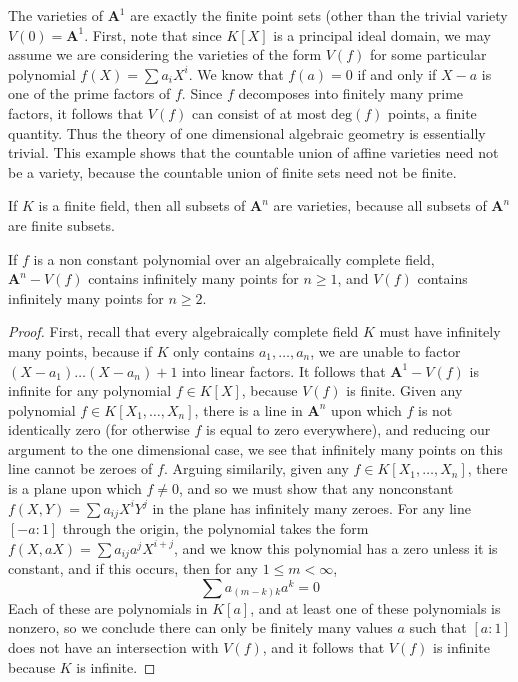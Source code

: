 \begin{example}
    The varieties of $\mathbf{A}^1$ are exactly the finite point sets (other than the trivial variety $V(0) = \mathbf{A}^1$. First, note that since $K[X]$ is a principal ideal domain, we may assume we are considering the varieties of the form $V(f)$ for some particular polynomial $f(X) = \sum a_i X^i$. We know that $f(a) = 0$ if and only if $X - a$ is one of the prime factors of $f$. Since $f$ decomposes into finitely many prime factors, it follows that $V(f)$ can consist of at most $\text{deg}(f)$ points, a finite quantity. Thus the theory of one dimensional algebraic geometry is essentially trivial. This example shows that the countable union of affine varieties need not be a variety, because the countable union of finite sets need not be finite.
\end{example}

\begin{example}
    If $K$ is a finite field, then all subsets of $\mathbf{A}^n$ are varieties, because all subsets of $\mathbf{A}^n$ are finite subsets.
\end{example}

\begin{prop}
    If $f$ is a non constant polynomial over an algebraically complete field, $\mathbf{A}^n - V(f)$ contains infinitely many points for $n \geq 1$, and $V(f)$ contains infinitely many points for $n \geq 2$.
\end{prop}
\begin{proof}
    First, recall that every algebraically complete field $K$ must have infinitely many points, because if $K$ only contains $a_1, \dots, a_n$, we are unable to factor $(X - a_1) \dots (X - a_n) + 1$ into linear factors. It follows that $\mathbf{A}^1 - V(f)$ is infinite for any polynomial $f \in K[X]$, because $V(f)$ is finite. Given any polynomial $f \in K[X_1, \dots, X_n]$, there is a line in $\mathbf{A}^n$ upon which $f$ is not identically zero (for otherwise $f$ is equal to zero everywhere), and reducing our argument to the one dimensional case, we see that infinitely many points on this line cannot be zeroes of $f$. Arguing similarily, given any $f \in K[X_1, \dots, X_n]$, there is a plane upon which $f \neq 0$, and so we must show that any nonconstant $f(X,Y) = \sum a_{ij} X^i Y^j$ in the plane has infinitely many zeroes. For any line $[-a:1]$ through the origin, the polynomial takes the form $f(X,aX) = \sum a_{ij} a^j X^{i+j}$, and we know this polynomial has a zero unless it is constant, and if this occurs, then for any $1 \leq m < \infty$,
    \[ \sum a_{(m-k)k} a^k = 0 \]
    Each of these are polynomials in $K[a]$, and at least one of these polynomials is nonzero, so we conclude there can only be finitely many values $a$ such that $[a:1]$ does not have an intersection with $V(f)$, and it follows that $V(f)$ is infinite because $K$ is infinite.
\end{proof}

